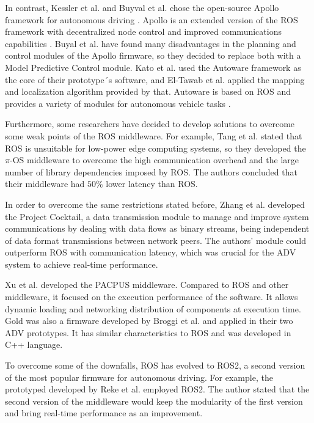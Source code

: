 \documentclass[lettersize,journal]{IEEEtran}
\begin{document}
In contrast, Kessler et al. \cite{Kessler2019} and Buyval et al. \cite{Buyval2019} chose the open-source Apollo framework for autonomous driving \cite{Apollo}. Apollo is an extended version of the ROS framework with decentralized node control and improved communications capabilities \cite{Kessler2019}. Buyal et al. have found many disadvantages in the planning and control modules of the Apollo firmware, so they decided to replace both with a Model Predictive Control module. Kato et al. \cite{Kato2015} used the Autoware framework \cite{Autoware} as the core of their prototype´s software, and El-Tawab et al. \cite{el2020autonomous} applied the mapping and localization algorithm provided by that. Autoware is based on ROS and provides a variety of modules for autonomous vehicle tasks \cite{Betz2019}. 

Furthermore, some researchers have decided to develop solutions to overcome some weak points of the ROS middleware. For example, Tang et al. \cite{Tang2018} stated that ROS is unsuitable for low-power edge computing systems, so they developed the $\pi$-OS middleware to overcome the high communication overhead and the large number of library dependencies imposed by ROS. The authors concluded that their middleware had $50\%$ lower latency than ROS. 

In order to overcome the same restrictions stated before, Zhang et al. \cite{Zhang2018} developed the Project Cocktail, a data transmission module to manage and improve system communications by dealing with data flows as binary streams, being independent of data format transmissions between network peers. The authors' module could outperform ROS with communication latency, which was crucial for the ADV system to achieve real-time performance.

Xu et al. \cite{Xu2018} developed the PACPUS middleware. Compared to ROS and other middleware, it focused on the execution performance of the software. It allows dynamic loading and networking distribution of components at execution time. Gold was also a firmware developed by Broggi et al. \cite{Broggi2015} \cite{Broggi2015a} and applied in their two ADV prototypes. It has similar characteristics to ROS and was developed in C++ language.

To overcome some of the downfalls, ROS has evolved to ROS2, a second version of the most popular firmware for autonomous driving. For example, the prototyped developed by Reke et al. \cite{Reke2020} employed ROS2. The author stated that the second version of the middleware would keep the modularity of the first version and bring real-time performance as an improvement.
\end{document}
